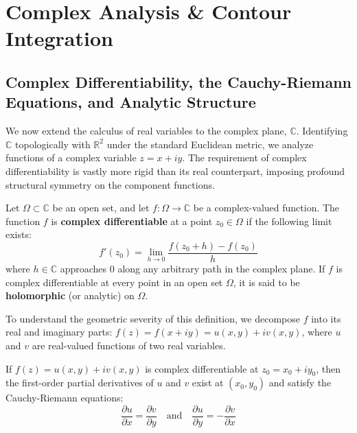 \section{Complex Analysis \& Contour Integration}

\subsection{Complex Differentiability, the Cauchy-Riemann Equations, and Analytic Structure}

We now extend the calculus of real variables to the complex plane, $\mathbb{C}$. Identifying $\mathbb{C}$ topologically with $\mathbb{R}^2$ under the standard Euclidean metric, we analyze functions of a complex variable $z = x + iy$. The requirement of complex differentiability is vastly more rigid than its real counterpart, imposing profound structural symmetry on the component functions.

\begin{definition}
Let $\Omega \subset \mathbb{C}$ be an open set, and let $f: \Omega \to \mathbb{C}$ be a complex-valued function. The function $f$ is \textbf{complex differentiable} at a point $z_0 \in \Omega$ if the following limit exists:
\[
f'(z_0) = \lim_{h \to 0} \frac{f(z_0 + h) - f(z_0)}{h}
\]
where $h \in \mathbb{C}$ approaches $0$ along any arbitrary path in the complex plane. If $f$ is complex differentiable at every point in an open set $\Omega$, it is said to be \textbf{holomorphic} (or analytic) on $\Omega$.
\end{definition}

To understand the geometric severity of this definition, we decompose $f$ into its real and imaginary parts: $f(z) = f(x + iy) = u(x, y) + i v(x, y)$, where $u$ and $v$ are real-valued functions of two real variables. 

\begin{theorem}
If $f(z) = u(x, y) + i v(x, y)$ is complex differentiable at $z_0 = x_0 + i y_0$, then the first-order partial derivatives of $u$ and $v$ exist at $(x_0, y_0)$ and satisfy the Cauchy-Riemann equations:
\[
\frac{\partial u}{\partial x} = \frac{\partial v}{\partial y} \quad \text{and} \quad \frac{\partial u}{\partial y} = -\frac{\partial v}{\partial x}
\]
\end{theorem}

